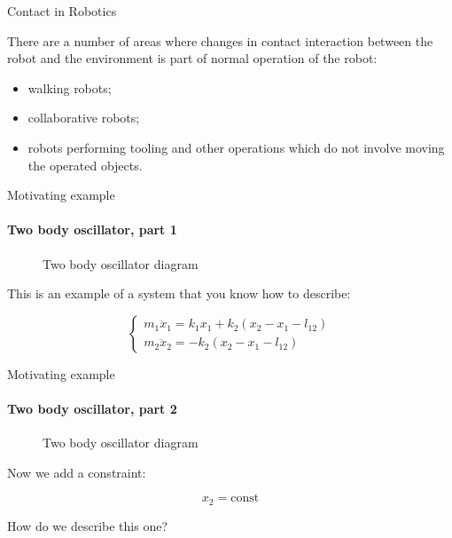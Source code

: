 \documentclass{beamer}
\begin{document}
\begin{frame}{Contact in Robotics}
\begin{flushleft}

There are a number of areas where changes in contact interaction between the robot and the environment is part of normal operation of the robot:

\bigskip

\begin{itemize}
    \item walking robots;
    \item collaborative robots;
    \item robots performing tooling and other operations which do not involve moving the operated objects.
\end{itemize}

\end{flushleft}
\end{frame}



\begin{frame}{Motivating example}
\framesubtitle{Two body oscillator, part 1}
\begin{flushleft}

\begin{figure}
    \centering
    
    \caption{Two body oscillator diagram}
    \label{fig:my_label}
\end{figure}

This is an example of a system that you know how to describe:

\begin{equation}
\begin{cases}
    m_1 \ddot x_1 = k_1 x_1 + k_2 (x_2 - x_1 - l_{12}) \\
    m_2 \ddot x_2 = -k_2 (x_2 - x_1 - l_{12})
\end{cases}
\end{equation}

\end{flushleft}
\end{frame}



\begin{frame}{Motivating example}
\framesubtitle{Two body oscillator, part 2}
\begin{flushleft}

\begin{figure}
    \centering
    
    \caption{Two body oscillator diagram}
\end{figure}

Now we add a constraint:

\begin{equation}
x_2 = \text{const}
\end{equation}

How do we describe this one?

\end{flushleft}
\end{frame}
\end{document}
